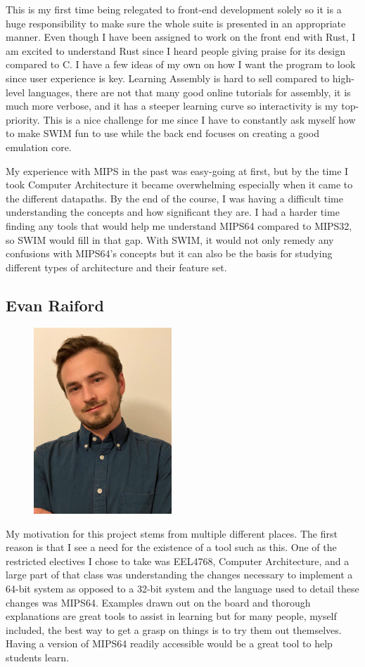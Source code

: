 \documentclass[
    parskip=half,
    fontsize=12pt,
    titlepage=firstiscover,
    toc=bibliography,
    numbers=endperiod
]{scrartcl}
\begin{document}
This is my first time being relegated to front-end development solely so it is a huge responsibility to make sure the whole suite is presented in an appropriate manner. Even though I have been assigned to work on the front end with Rust, I am excited to understand Rust since I heard people giving praise for its design compared to C. I have a few ideas of my own on how I want the program to look since user experience is key. Learning Assembly is hard to sell compared to high-level languages, there are not that many good online tutorials for assembly, it is much more verbose, and it has a steeper learning curve so interactivity is my top-priority. This is a nice challenge for me since I have to constantly ask myself how to make SWIM fun to use while the back end focuses on creating a good emulation core.

My experience with MIPS in the past was easy-going at first, but by the time I took Computer Architecture it became overwhelming especially when it came to the different datapaths. By the end of the course, I was having a difficult time understanding the concepts and how significant they are. I had a harder time finding any tools that would help me understand MIPS64 compared to MIPS32, so SWIM would fill in that gap. With SWIM, it would not only remedy any confusions with MIPS64's concepts but it can also be the basis for studying different types of architecture and their feature set.


\subsection{Evan Raiford}
\begin{figure}[H]
    \includegraphics[height=7cm]{profile-evan}
\end{figure}

My motivation for this project stems from multiple different places. The first reason is that I see a need for the existence of a tool such as this. One of the restricted electives I chose to take was EEL4768, Computer Architecture, and a large part of that class was understanding the changes necessary to implement a 64-bit system as opposed to a 32-bit system and the language used to detail these changes was MIPS64. Examples drawn out on the board and thorough explanations are great tools to assist in learning but for many people, myself included, the best way to get a grasp on things is to try them out themselves. Having a version of MIPS64 readily accessible would be a great tool to help students learn.
\end{document}
